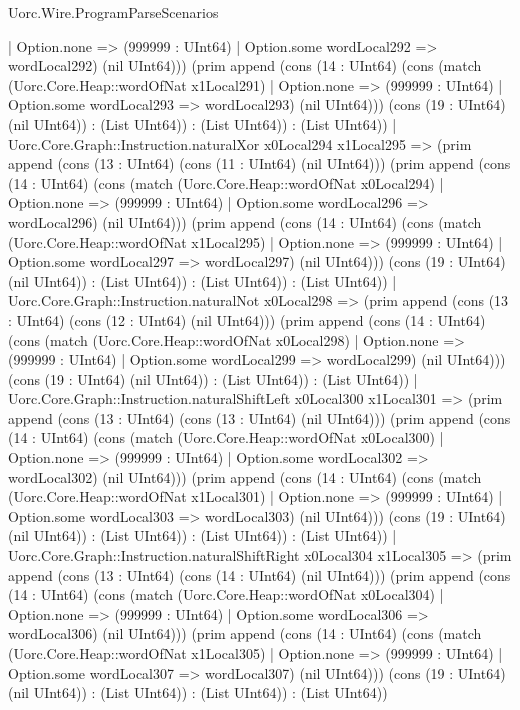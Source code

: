 \begin{lexlean}{Uorc.Wire.ProgramParseScenarios}
\begin{semanticmodule}
{      | Option.none => (999999 : UInt64)
      | Option.some wordLocal292 => wordLocal292) (nil UInt64))) (prim append (cons (14 : UInt64) (cons (match (Uorc.Core.Heap::wordOfNat x1Local291)
      | Option.none => (999999 : UInt64)
      | Option.some wordLocal293 => wordLocal293) (nil UInt64))) (cons (19 : UInt64) (nil UInt64)) : (List UInt64)) : (List UInt64)) : (List UInt64))
    | Uorc.Core.Graph::Instruction.naturalXor x0Local294 x1Local295 => (prim append (cons (13 : UInt64) (cons (11 : UInt64) (nil UInt64))) (prim append (cons (14 : UInt64) (cons (match (Uorc.Core.Heap::wordOfNat x0Local294)
      | Option.none => (999999 : UInt64)
      | Option.some wordLocal296 => wordLocal296) (nil UInt64))) (prim append (cons (14 : UInt64) (cons (match (Uorc.Core.Heap::wordOfNat x1Local295)
      | Option.none => (999999 : UInt64)
      | Option.some wordLocal297 => wordLocal297) (nil UInt64))) (cons (19 : UInt64) (nil UInt64)) : (List UInt64)) : (List UInt64)) : (List UInt64))
    | Uorc.Core.Graph::Instruction.naturalNot x0Local298 => (prim append (cons (13 : UInt64) (cons (12 : UInt64) (nil UInt64))) (prim append (cons (14 : UInt64) (cons (match (Uorc.Core.Heap::wordOfNat x0Local298)
      | Option.none => (999999 : UInt64)
      | Option.some wordLocal299 => wordLocal299) (nil UInt64))) (cons (19 : UInt64) (nil UInt64)) : (List UInt64)) : (List UInt64))
    | Uorc.Core.Graph::Instruction.naturalShiftLeft x0Local300 x1Local301 => (prim append (cons (13 : UInt64) (cons (13 : UInt64) (nil UInt64))) (prim append (cons (14 : UInt64) (cons (match (Uorc.Core.Heap::wordOfNat x0Local300)
      | Option.none => (999999 : UInt64)
      | Option.some wordLocal302 => wordLocal302) (nil UInt64))) (prim append (cons (14 : UInt64) (cons (match (Uorc.Core.Heap::wordOfNat x1Local301)
      | Option.none => (999999 : UInt64)
      | Option.some wordLocal303 => wordLocal303) (nil UInt64))) (cons (19 : UInt64) (nil UInt64)) : (List UInt64)) : (List UInt64)) : (List UInt64))
    | Uorc.Core.Graph::Instruction.naturalShiftRight x0Local304 x1Local305 => (prim append (cons (13 : UInt64) (cons (14 : UInt64) (nil UInt64))) (prim append (cons (14 : UInt64) (cons (match (Uorc.Core.Heap::wordOfNat x0Local304)
      | Option.none => (999999 : UInt64)
      | Option.some wordLocal306 => wordLocal306) (nil UInt64))) (prim append (cons (14 : UInt64) (cons (match (Uorc.Core.Heap::wordOfNat x1Local305)
      | Option.none => (999999 : UInt64)
      | Option.some wordLocal307 => wordLocal307) (nil UInt64))) (cons (19 : UInt64) (nil UInt64)) : (List UInt64)) : (List UInt64)) : (List UInt64))
}
\end{semanticmodule}
\end{lexlean}
